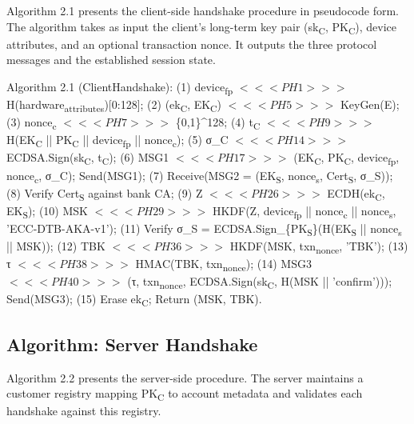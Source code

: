 \indent Algorithm 2.1 presents the client-side handshake procedure in pseudocode form. The algorithm takes as input the client's long-term key pair (sk\textsubscript{C}, PK\textsubscript{C}), device attributes, and an optional transaction nonce. It outputs the three protocol messages and the established session state.

\indent Algorithm 2.1 (ClientHandshake): (1) device\textsubscript{fp} $<<<PH1>>>$ H(hardware\textsubscript{attributes})[0:128]; (2) (ek\textsubscript{C}, EK\textsubscript{C}) $<<<PH5>>>$ KeyGen(E); (3) nonce\textsubscript{c} $<<<PH7>>>$ \{0,1\}\textasciicircum{}128; (4) t\textsubscript{C} $<<<PH9>>>$ H(EK\textsubscript{C} || PK\textsubscript{C} || device\textsubscript{fp} || nonce\textsubscript{c}); (5) σ\_C $<<<PH14>>>$ ECDSA.Sign(sk\textsubscript{C}, t\textsubscript{C}); (6) MSG1 $<<<PH17>>>$ (EK\textsubscript{C}, PK\textsubscript{C}, device\textsubscript{fp}, nonce\textsubscript{c}, σ\_C); Send(MSG1); (7) Receive(MSG2 = (EK\textsubscript{S}, nonce\textsubscript{s}, Cert\textsubscript{S}, σ\_S)); (8) Verify Cert\textsubscript{S} against bank CA; (9) Z $<<<PH26>>>$ ECDH(ek\textsubscript{C}, EK\textsubscript{S}); (10) MSK $<<<PH29>>>$ HKDF(Z, device\textsubscript{fp} || nonce\textsubscript{c} || nonce\textsubscript{s}, 'ECC-DTB-AKA-v1'); (11) Verify σ\_S = ECDSA.Sign\_\{PK\textsubscript{S}\}(H(EK\textsubscript{S} || nonce\textsubscript{s} || MSK)); (12) TBK $<<<PH36>>>$ HKDF(MSK, txn\textsubscript{nonce}, 'TBK'); (13) τ $<<<PH38>>>$ HMAC(TBK, txn\textsubscript{nonce}); (14) MSG3 $<<<PH40>>>$ (τ, txn\textsubscript{nonce}, ECDSA.Sign(sk\textsubscript{C}, H(MSK || 'confirm'))); Send(MSG3); (15) Erase ek\textsubscript{C}; Return (MSK, TBK).

\subsection{Algorithm: Server Handshake}

\indent Algorithm 2.2 presents the server-side procedure. The server maintains a customer registry mapping PK\textsubscript{C} to account metadata and validates each handshake against this registry.

